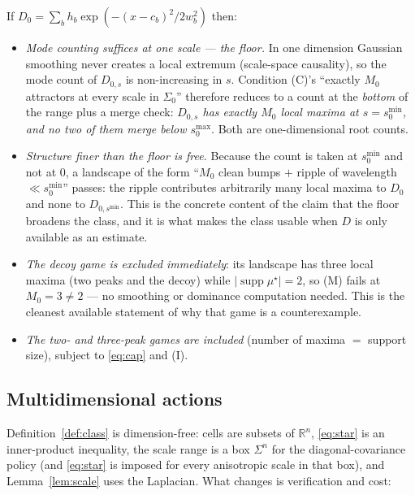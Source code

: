 \documentclass[11pt]{article}
\theoremstyle{definition}
\newcommand{\R}{\mathbb{R}}
\DeclareMathOperator{\supp}{supp}
\begin{document}
If $D_0 = \sum_b h_b \exp(-(x-c_b)^2/2w_b^2)$ then:
\begin{itemize}
\item \emph{Mode counting suffices at one scale --- the floor.} In one dimension
  Gaussian smoothing never creates a local extremum (scale-space causality), so
  the mode count of $D_{0,s}$ is non-increasing in $s$. Condition (C)'s
  ``exactly $M_0$ attractors at every scale in $\Sigma_0$'' therefore reduces to
  a count at the \emph{bottom} of the range plus a merge check: \emph{$D_{0,s}$
  has exactly $M_0$ local maxima at $s = s^{\min}_0$, and no two of them merge
  below $s^{\max}_0$}. Both are one-dimensional root counts.
\item \emph{Structure finer than the floor is free.} Because the count is taken
  at $s^{\min}_0$ and not at $0$, a landscape of the form ``$M_0$ clean bumps
  $+$ ripple of wavelength $\ll s^{\min}_0$'' passes: the ripple contributes
  arbitrarily many local maxima to $D_0$ and none to $D_{0,s^{\min}}$. This is
  the concrete content of the claim that the floor broadens the class, and it is
  what makes the class usable when $D$ is only available as an estimate.
\item \emph{The decoy game is excluded immediately}: its landscape has three
  local maxima (two peaks and the decoy) while $|\supp\mu^\star| = 2$, so (M)
  fails at $M_0 = 3 \ne 2$ --- no smoothing or dominance computation needed. This
  is the cleanest available statement of why that game is a counterexample.
\item \emph{The two- and three-peak games are included} (number of maxima
  $=$ support size), subject to \eqref{eq:cap} and (I).
\end{itemize}

\subsection{Multidimensional actions}\label{sec:multidim}

Definition~\ref{def:class} is dimension-free: cells are subsets of $\R^{n}$,
\eqref{eq:star} is an inner-product inequality, the scale range is a box
$\Sigma^n$ for the diagonal-covariance policy (and \eqref{eq:star} is imposed for
every anisotropic scale in that box), and Lemma~\ref{lem:scale} uses the
Laplacian. What changes is verification and cost:
\end{document}
